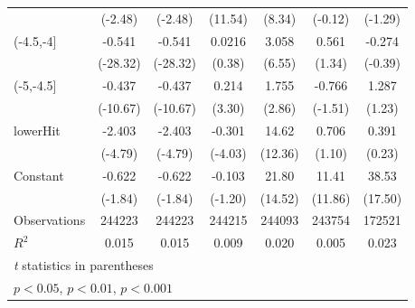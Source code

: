 {\begin{tabular}{l*{6}{c}}
                    &     (-2.48)         &     (-2.48)         &     (11.54)         &      (8.34)         &     (-0.12)         &     (-1.29)         \\
[1em]
(-4.5,-4]           &      -0.541\sym{***}&      -0.541\sym{***}&      0.0216         &       3.058\sym{***}&       0.561         &      -0.274         \\
                    &    (-28.32)         &    (-28.32)         &      (0.38)         &      (6.55)         &      (1.34)         &     (-0.39)         \\
[1em]
(-5,-4.5]           &      -0.437\sym{***}&      -0.437\sym{***}&       0.214\sym{**} &       1.755\sym{**} &      -0.766         &       1.287         \\
                    &    (-10.67)         &    (-10.67)         &      (3.30)         &      (2.86)         &     (-1.51)         &      (1.23)         \\
[1em]
lowerHit            &      -2.403\sym{***}&      -2.403\sym{***}&      -0.301\sym{***}&       14.62\sym{***}&       0.706         &       0.391         \\
                    &     (-4.79)         &     (-4.79)         &     (-4.03)         &     (12.36)         &      (1.10)         &      (0.23)         \\
[1em]
Constant            &      -0.622         &      -0.622         &      -0.103         &       21.80\sym{***}&       11.41\sym{***}&       38.53\sym{***}\\
                    &     (-1.84)         &     (-1.84)         &     (-1.20)         &     (14.52)         &     (11.86)         &     (17.50)         \\
\hline
Observations        &      244223         &      244223         &      244215         &      244093         &      243754         &      172521         \\
\(R^{2}\)           &       0.015         &       0.015         &       0.009         &       0.020         &       0.005         &       0.023         \\
\hline\hline
\multicolumn{7}{l}{\footnotesize \textit{t} statistics in parentheses}\\
\multicolumn{7}{l}{\footnotesize \sym{*} \(p<0.05\), \sym{**} \(p<0.01\), \sym{***} \(p<0.001\)}\\
\end{tabular}
}
